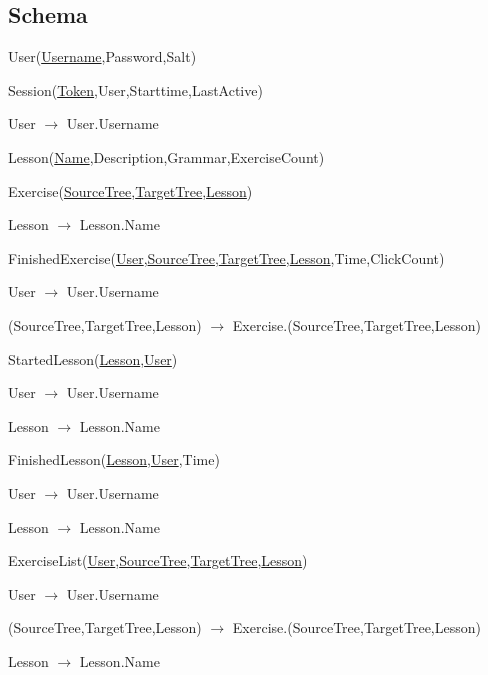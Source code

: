 \documentclass{scrartcl}
\begin{document}
\subsection{Schema}
\begin{description}
\item User(\underline{Username},Password,Salt)
\item Session(\underline{Token},User,Starttime,LastActive)
  \begin{description}
  \item User $\rightarrow$ User.Username
  \end{description}
\item Lesson(\underline{Name},Description,Grammar,ExerciseCount)
\item Exercise(\underline{SourceTree},\underline{TargetTree},\underline{Lesson})
  \begin{description}
  \item Lesson $\rightarrow$ Lesson.Name
  \end{description}
\item FinishedExercise(\underline{User},\underline{SourceTree},\underline{TargetTree},\underline{Lesson},Time,ClickCount)
  \begin{description}
  \item User $\rightarrow$ User.Username
  \item (SourceTree,TargetTree,Lesson) $\rightarrow$ Exercise.(SourceTree,TargetTree,Lesson)
  \end{description}
\item StartedLesson(\underline{Lesson},\underline{User})
  \begin{description}
  \item User $\rightarrow$ User.Username
  \item Lesson $\rightarrow$ Lesson.Name
  \end{description}
\item FinishedLesson(\underline{Lesson},\underline{User},Time)
  \begin{description}
  \item User $\rightarrow$ User.Username
  \item Lesson $\rightarrow$ Lesson.Name
  \end{description}
\item ExerciseList(\underline{User},\underline{SourceTree},\underline{TargetTree},\underline{Lesson})
  \begin{description}
  \item User $\rightarrow$ User.Username
  \item (SourceTree,TargetTree,Lesson) $\rightarrow$ Exercise.(SourceTree,TargetTree,Lesson)
  \item Lesson $\rightarrow$ Lesson.Name
  \end{description}
\end{description}
\end{document}
